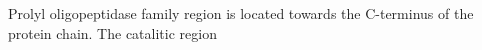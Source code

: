 Prolyl oligopeptidase family region is located towards the C-terminus of the protein chain. The catalitic region 